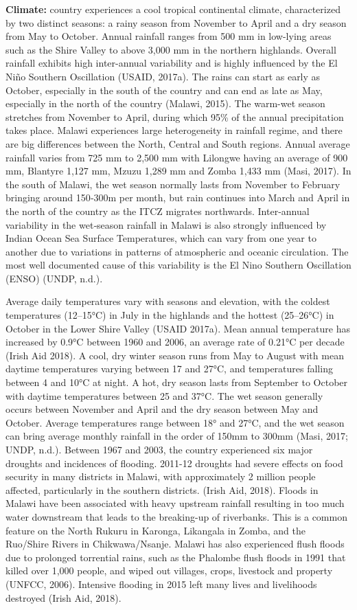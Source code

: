 \documentclass[
]{book}
\begin{document}
\textbf{Climate:} country experiences a cool tropical continental climate, characterized by two distinct seasons: a rainy season from November to April and a dry season from May to October. Annual rainfall ranges from 500 mm in low-lying areas such as the Shire Valley to above 3,000 mm in the northern highlands. Overall rainfall exhibits high inter-annual variability and is highly influenced by the El Niño Southern Oscillation (USAID, 2017a). The rains can start as early as October, especially in the south of the country and can end as late as May, especially in the north of the country (Malawi, 2015). The warm-wet season stretches from November to April, during which 95\% of the annual precipitation takes place. Malawi experiences large heterogeneity in rainfall regime, and there are big differences between the North, Central and South regions. Annual average rainfall varies from 725 mm to 2,500 mm with Lilongwe having an average of 900 mm, Blantyre 1,127 mm, Mzuzu 1,289 mm and Zomba 1,433 mm (Masi, 2017). In the south of Malawi, the wet season normally lasts from November to February bringing around 150‐300m per month, but rain continues into March and April in the north of the country as the ITCZ migrates northwards. Inter‐annual variability in the wet‐season rainfall in Malawi is also strongly influenced by Indian Ocean Sea Surface Temperatures, which can vary from one year to another due to variations in patterns of atmospheric and oceanic circulation. The most well documented cause of this variability is the El Nino Southern Oscillation (ENSO) (UNDP, n.d.).

Average daily temperatures vary with seasons and elevation, with the coldest temperatures (12--15°C) in July in the highlands and the hottest (25--26°C) in October in the Lower Shire Valley (USAID 2017a). Mean annual temperature has increased by 0.9°C between 1960 and 2006, an average rate of 0.21°C per decade (Irish Aid 2018). A cool, dry winter season runs from May to August with mean daytime temperatures varying between 17 and 27°C, and temperatures falling between 4 and 10°C at night. A hot, dry season lasts from September to October with daytime temperatures between 25 and 37°C. The wet season generally occurs between November and April and the dry season between May and October. Average temperatures range between 18° and 27°C, and the wet season can bring average monthly rainfall in the order of 150mm to 300mm (Masi, 2017; UNDP, n.d.). Between 1967 and 2003, the country experienced six major droughts and incidences of flooding. 2011-12 droughts had severe effects on food security in many districts in Malawi, with approximately 2 million people affected, particularly in the southern districts. (Irish Aid, 2018). Floods in Malawi have been associated with heavy upstream rainfall resulting in too much water downstream that leads to the breaking-up of riverbanks. This is a common feature on the North Rukuru in Karonga, Likangala in Zomba, and the Ruo/Shire Rivers in Chikwawa/Nsanje. Malawi has also experienced flush floods due to prolonged torrential rains, such as the Phalombe flush floods in 1991 that killed over 1,000 people, and wiped out villages, crops, livestock and property (UNFCC, 2006). Intensive flooding in 2015 left many lives and livelihoods destroyed (Irish Aid, 2018).
\end{document}
